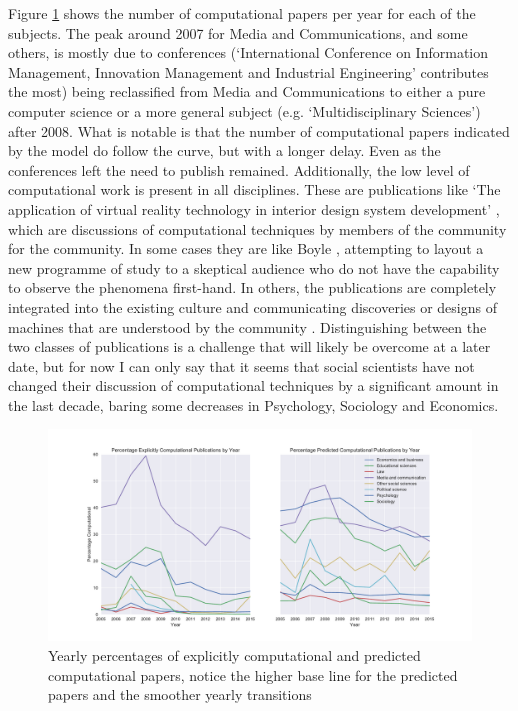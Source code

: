 \documentclass[12pt, a4paper]{article}
\begin{document}
Figure \ref{temporal} shows the number of computational papers per year for each of the subjects. The peak around 2007 for Media and Communications, and some others, is mostly due to conferences (`International Conference on Information Management, Innovation Management and Industrial Engineering' contributes the most) being reclassified from Media and Communications to either a pure computer science or a more general subject (e.g. `Multidisciplinary Sciences') after 2008. What is notable is that the number of computational papers indicated by the model do follow the curve, but with a longer delay. Even as the conferences left the need to publish remained. Additionally, the low level of computational work is present in all disciplines. These are publications like `The application of virtual reality technology in interior design system development' \citep{chuanrong2016application}, which are discussions of computational techniques by members of the community for the community. In some cases they are like Boyle \citep{shapin1985leviathan}, attempting to layout a new programme of study to a skeptical audience who do not have the capability to observe the phenomena first-hand. In others, the publications are completely integrated into the existing culture and communicating discoveries or designs of machines that are understood by the community \citep{cetina2009epistemic}. Distinguishing between the two classes of publications is a challenge that will likely be overcome at a later date, but for now I can only say that it seems that social scientists have not changed their discussion of computational  techniques by a significant amount in the last decade, baring some decreases in Psychology, Sociology and Economics.

\begin{figure}[H]
	\centering
	\begin{adjustbox}{center}
		\includegraphics[width=1.2\textwidth]{temporal}
	\end{adjustbox}
	\caption{Yearly percentages of explicitly computational and predicted computational papers, notice the higher base line for the predicted papers and the smoother yearly transitions }\label{temporal}
\end{figure}
\end{document}
